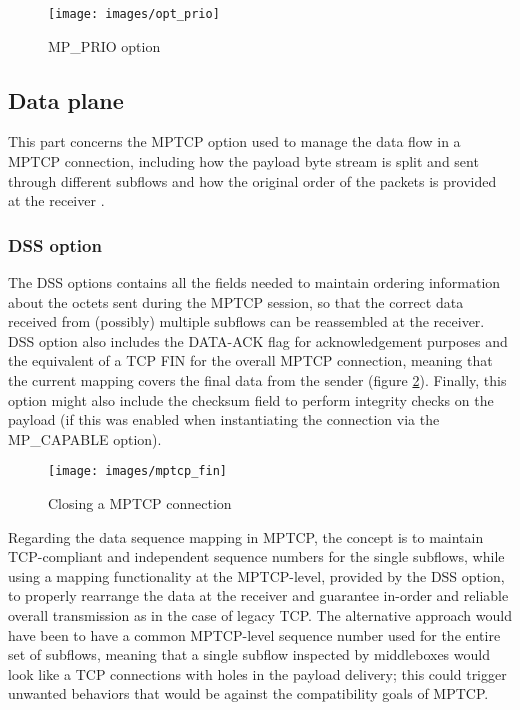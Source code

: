 \begin{figure}[!htb]
\centering
\texttt{[image: images/opt\_prio]}
\caption{MP\_PRIO option}
\label{fig:opt_prio}
\end{figure}

\subsection{Data plane}
\label{dataplane}
This part concerns the MPTCP option used to manage the data flow in a MPTCP connection, including how the payload byte stream is split and sent through different subflows and how the original order of the packets is provided at the receiver \cite{rfc6824}.

\subsubsection{DSS option}
\label{dss}
The DSS options contains all the fields needed to maintain ordering information about the octets sent during the MPTCP session, so that the correct data received from (possibly) multiple subflows can be reassembled at the receiver. DSS option also includes the DATA-ACK flag for acknowledgement purposes and the equivalent of a TCP FIN for the overall MPTCP connection, meaning that the current mapping covers the final data from the sender (figure \ref{fig:mptcp_fin}). Finally, this option might also include the checksum field to perform integrity checks on the payload (if this was enabled when instantiating the connection via the MP\_CAPABLE option).

\begin{figure}[!htb]
\centering
\texttt{[image: images/mptcp\_fin]}
\caption{Closing a MPTCP connection}
\label{fig:mptcp_fin}
\end{figure}

Regarding the data sequence mapping in MPTCP, the concept is to maintain TCP-compliant and independent sequence numbers for the single subflows, while using a mapping functionality at the MPTCP-level, provided by the DSS option, to properly rearrange the data at the receiver and guarantee in-order and reliable overall transmission as in the case of legacy TCP. The alternative approach would have been to have a common MPTCP-level sequence number used for the entire set of subflows, meaning that a single subflow inspected by middleboxes would look like a TCP connections with holes in the payload delivery; this could trigger unwanted behaviors that would be against the compatibility goals of MPTCP.

